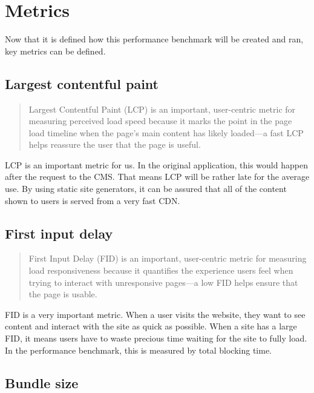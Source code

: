\section{Metrics}

Now that it is defined how this performance benchmark will be created and ran, key metrics can be defined.

\subsection{Largest contentful paint}

\begin{quote}
	Largest Contentful Paint (LCP) is an important, user-centric metric for measuring perceived load speed because it marks the point in the page load timeline when the page's main content has likely loaded—a fast LCP helps reassure the user that the page is useful.
	\hfill \cite{webvitalswebsite}
\end{quote}

LCP is an important metric for us. In the original application, this would happen after the request to the CMS. 
That means LCP will be rather late for the average use.
By using static site generators, it can be assured that all of the content shown to users is served from a very fast CDN. 

\subsection{First input delay}

\begin{quote}
	First Input Delay (FID) is an important, user-centric metric for measuring load responsiveness because it quantifies the experience users feel when trying to interact with unresponsive pages—a low FID helps ensure that the page is usable.
	\hfill \cite{webvitalswebsite}
\end{quote}

FID is a very important metric. When a user visits the website, they want to see content and interact with the site as quick as possible. 
When a site has a large FID, it means users have to waste precious time waiting for the site to fully load. In the performance benchmark, this is measured by total blocking time. 

\subsection{Bundle size}

